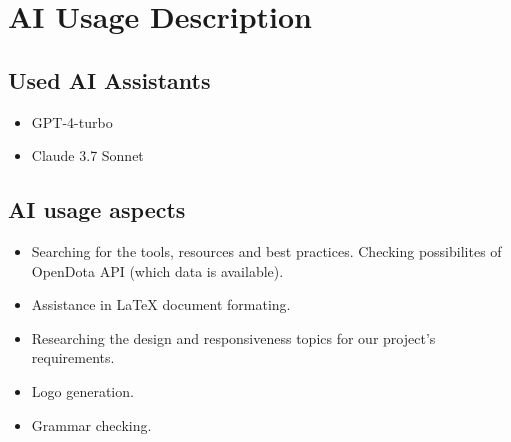 \section{AI Usage Description}

\subsection{Used AI Assistants}

\begin{itemize}
    \item GPT-4-turbo
    \item Claude 3.7 Sonnet
\end{itemize}

\subsection{AI usage aspects}

\begin{itemize}

    \item Searching for the tools, resources and best practices. Checking possibilites of OpenDota API (which data is available).
    \item Assistance in LaTeX document formating.
    \item Researching the design and responsiveness topics for our project's requirements.
    \item Logo generation.
    \item Grammar checking.

\end{itemize}



